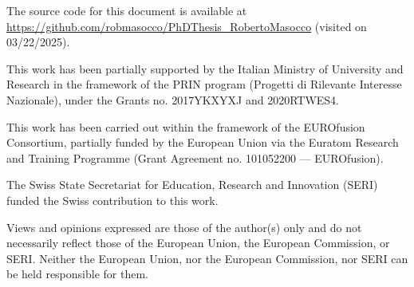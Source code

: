 \whitepage
\thispagestyle{empty}
\vspace*{\fill}
{\small
The source code for this document is available at \url{https://github.com/robmasocco/PhDThesis_RobertoMasocco} (visited on 03/22/2025).

\medskip

This work has been partially supported by the Italian Ministry of University and Research in the framework of the PRIN program (Progetti di Rilevante Interesse Nazionale), under the Grants no. 2017YKXYXJ and 2020RTWES4.

\medskip

This work has been carried out within the framework of the EUROfusion Consortium, partially funded by the European Union via the Euratom Research and Training Programme (Grant Agreement no. 101052200 — EUROfusion).

\medskip

The Swiss State Secretariat for Education, Research and Innovation (SERI) funded the Swiss contribution to this work.

\medskip

Views and opinions expressed are those of the author(s) only and do not necessarily reflect those of the European Union, the European Commission, or SERI. Neither the European Union, nor the European Commission, nor SERI can be held responsible for them.
}
\whitepage
\thispagestyle{empty}
